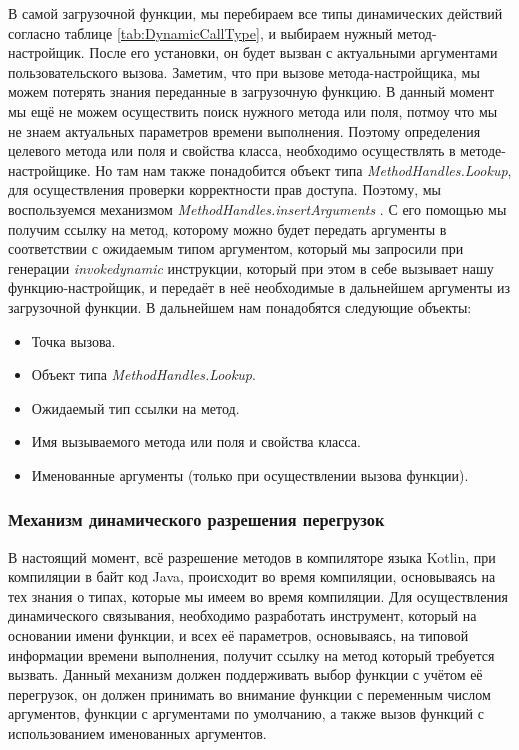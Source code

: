 В самой загрузочной функции, мы перебираем все типы динамических  действий согласно таблице \ref{tab:DynamicCallType}, и выбираем нужный метод-настройщик. После его установки, он будет вызван с актуальными аргументами пользовательского вызова. Заметим, что при вызове метода-настройщика, мы можем потерять знания переданные в загрузочную функцию. В данный момент мы ещё не можем осуществить поиск нужного метода или поля, потмоу что мы не знаем актуальных параметров времени выполнения. Поэтому определения целевого метода или поля и свойства класса, необходимо осуществлять в методе-настройщике. Но там нам также понадобится объект типа \textit{MethodHandles.Lookup}, для осуществления проверки корректности прав доступа. Поэтому, мы воспользуемся механизмом  \textit{MethodHandles.insertArguments} \cite{javadoc:MethodHandlesLookup}. С его помощью мы получим ссылку на метод, которому можно будет передать аргументы в соответствии с ожидаемым типом аргументом, который мы запросили при генерации \textit{invokedynamic} инструкции, который при этом в себе вызывает нашу функцию-настройщик, и передаёт в неё необходимые в дальнейшем аргументы из загрузочной функции. В дальнейшем нам понадобятся следующие объекты:
\begin{itemize}
    \item Точка вызова.
    \item Объект типа \textit{MethodHandles.Lookup}.
    \item Ожидаемый тип ссылки на метод.
    \item Имя вызываемого метода или поля и свойства класса.
    \item Именованные аргументы (только при осуществлении вызова функции).
\end{itemize}


\subsubsection{Механизм динамического разрешения перегрузок}
\label{realization:dynamicResolve}

В настоящий момент, всё разрешение методов в компиляторе языка Kotlin, при компиляции в байт код Java, происходит во время компиляции, основываясь на тех знания о типах, которые мы имеем во время компиляции. Для осуществления динамического связывания, необходимо разработать инструмент, который на основании имени функции, и всех её параметров, основываясь, на типовой информации времени выполнения, получит ссылку на метод который требуется вызвать. Данный механизм должен поддерживать выбор функции с учётом её перегрузок, он должен принимать во внимание функции с переменным числом аргументов, функции с аргументами по умолчанию, а также вызов функций с использованием именованных аргументов.

